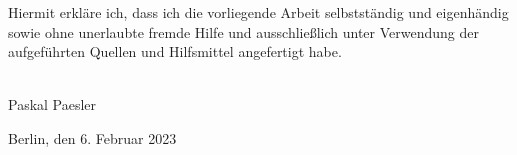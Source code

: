 
\begin{erklärung}        %
Hiermit erkläre ich, dass ich die vorliegende Arbeit selbstständig und eigenhändig sowie ohne unerlaubte fremde Hilfe und ausschließlich unter Verwendung der aufgeführten Quellen und Hilfsmittel angefertigt habe.


\vspace{25mm}

\begin{minipage}[t]{5cm}
\flushleft
\hrulefill \\
Paskal Paesler
\end{minipage}
\hfill
\begin{minipage}[t]{7cm}
\flushright
Berlin, den 6. Februar 2023
\end{minipage}
\end{erklärung}
\ifCLASSINFOlangDE
{}
\else
{}
\fi
